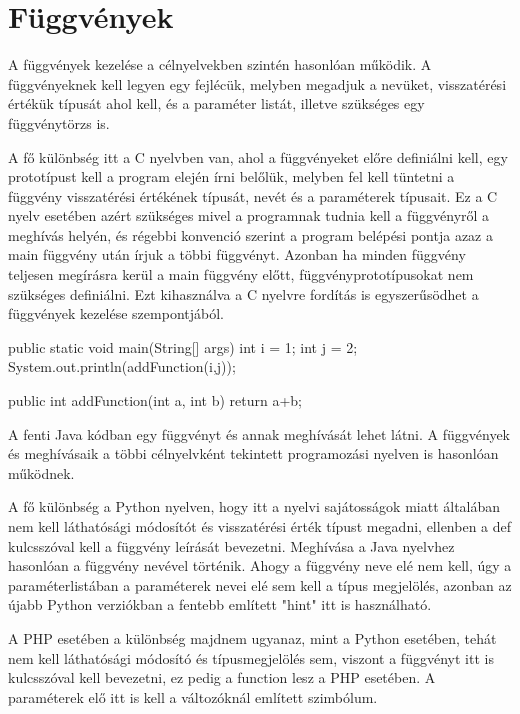 \section{Függvények}

A függvények kezelése a célnyelvekben szintén hasonlóan működik. A függvényeknek kell legyen egy fejlécük, melyben megadjuk a nevüket, visszatérési értékük típusát ahol kell, és a paraméter listát, illetve szükséges egy függvénytörzs is.

A fő különbség itt a C nyelvben van, ahol a függvényeket előre definiálni kell, egy prototípust kell a program elején írni belőlük, melyben fel kell tüntetni a függvény visszatérési értékének típusát, nevét és a paraméterek típusait. Ez a C nyelv esetében azért szükséges mivel a programnak tudnia kell a függvényről a meghívás helyén, és régebbi konvenció szerint a program belépési pontja azaz a main függvény után írjuk a többi függvényt. Azonban ha minden függvény teljesen megírásra kerül a main függvény előtt, függvényprototípusokat nem szükséges definiálni. Ezt kihasználva a C nyelvre fordítás is egyszerűsödhet a függvények kezelése szempontjából.

\begin{cpp}
	public static void main(String[] args) {
		int i = 1;
		int j = 2;
		System.out.println(addFunction(i,j));
	}
	
	public int addFunction(int a, int b) {
		return a+b;
	}
\end{cpp}

A fenti Java kódban egy függvényt és annak meghívását lehet látni. A függvények és meghívásaik a többi célnyelvként tekintett programozási nyelven is hasonlóan működnek.

A fő különbség a Python nyelven, hogy itt a nyelvi sajátosságok miatt általában nem kell láthatósági módosítót és visszatérési érték típust megadni, ellenben a def kulcsszóval kell a függvény leírását bevezetni. Meghívása a Java nyelvhez hasonlóan a függvény nevével történik. Ahogy a függvény neve elé nem kell, úgy a paraméterlistában a paraméterek nevei elé sem kell a típus megjelölés, azonban az újabb Python verziókban a fentebb említett "hint" itt is használható.

A PHP esetében a különbség majdnem ugyanaz, mint a Python esetében, tehát nem kell láthatósági módosító és típusmegjelölés sem, viszont a függvényt itt is kulcsszóval kell bevezetni, ez pedig a function lesz a PHP esetében. A paraméterek elő itt is kell a változóknál említett \textdollar szimbólum.

